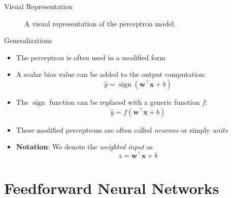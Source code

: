 \documentclass{beamer}
\DeclareMathOperator{\sign}{sign}
\begin{document}
	\begin{frame}{Visual Representation}
		\begin{figure}
			
			\caption{A visual representation of the perceptron model.}
		\end{figure}
	\end{frame}
	\begin{frame}{Generalizations}
		\begin{itemize}
			\item <1-> The perceptron is often used in a modified form
			\item <2-> A scalar bias value can be added to the output computation:
			\begin{equation}
			\hat{y} = \sign\left (\bm{w}^\top\bm{x} + b\right )
			\end{equation}
			\item <3-> The $\sign$ function can be replaced with a generic function $f$:
			\begin{equation}
			\hat{y} = f\left (\bm{w}^\top\bm{x} + b\right )
			\end{equation}
			\item <4-> These modified perceptrons are often called \emph{neurons} or simply \emph{units}
			\item <5-> \textbf{Notation}: We denote the \emph{weighted input} as
			\begin{equation}
			z = \bm{w}^\top\bm{x} + b
			\end{equation}
		\end{itemize}
	\end{frame}
%						
	
	\section{Feedforward Neural Networks}
	
\end{document}
